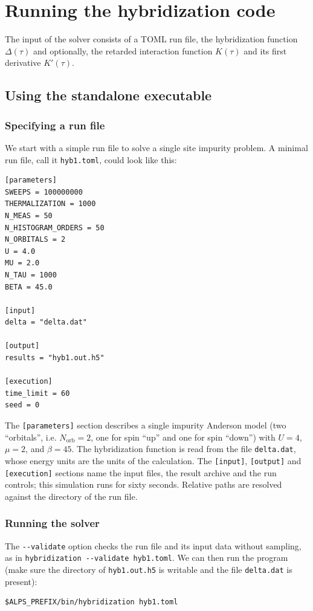 \documentclass[aps,prb,floatfix,superscriptaddress,twocolumn,notitlepage]{revtex4-1}
\begin{document}
\section{Running the hybridization code}

The input of the solver consists of a TOML run file, the hybridization function $\Delta(\tau)$ and optionally, the retarded interaction function $K(\tau)$ and its first derivative $K'(\tau)$.

\subsection{Using the standalone executable}

\subsubsection{Specifying a run file}
We start with a simple run file to solve a single site impurity problem. A minimal run file, call it \verb#hyb1.toml#, could look like this:
\begin{verbatim}
[parameters]
SWEEPS = 100000000
THERMALIZATION = 1000
N_MEAS = 50
N_HISTOGRAM_ORDERS = 50
N_ORBITALS = 2
U = 4.0
MU = 2.0
N_TAU = 1000
BETA = 45.0

[input]
delta = "delta.dat"

[output]
results = "hyb1.out.h5"

[execution]
time_limit = 60
seed = 0
\end{verbatim}
The \verb#[parameters]# section describes a single impurity Anderson model (two ``orbitals'', i.e. $N_{\text{orb}}=2$, one for spin ``up'' and one for spin ``down'') with $U=4$, $\mu=2$, and $\beta=45$. The hybridization function is read from the file \verb#delta.dat#, whose energy units are the units of the calculation. The \verb#[input]#, \verb#[output]# and \verb#[execution]# sections name the input files, the result archive and the run controls; this simulation runs for sixty seconds. Relative paths are resolved against the directory of the run file.

\subsubsection{Running the solver}

The \verb#--validate# option checks the run file and its input data without sampling, as in \verb#hybridization --validate hyb1.toml#. We can then run the program (make sure the directory of \verb#hyb1.out.h5# is writable and the file \verb#delta.dat# is present):
\begin{verbatim}
$ALPS_PREFIX/bin/hybridization hyb1.toml
\end{verbatim}
\end{document}
